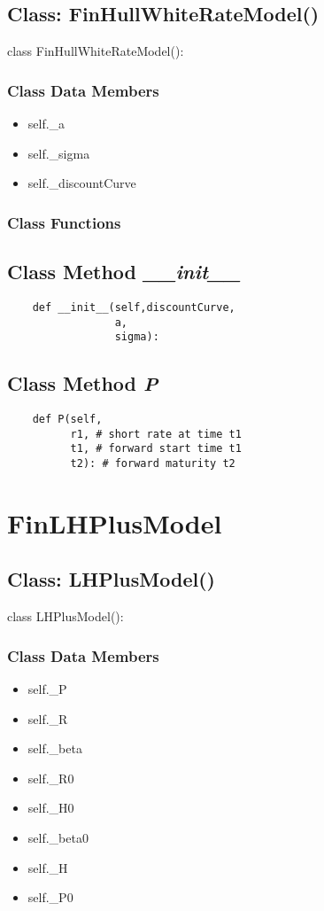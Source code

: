 \documentclass[twoside,11pt]{book}
\begin{document}
\subsection{Class: FinHullWhiteRateModel()}
class FinHullWhiteRateModel():

\subsubsection{Class Data Members}
\begin{itemize}
\item{self.\_a}
\item{self.\_sigma}
\item{self.\_discountCurve}
\end{itemize}

\subsubsection{Class Functions}

\subsection{Class Method {\it \_\_init\_\_}}


\begin{lstlisting}
    def __init__(self,discountCurve,
                 a,
                 sigma):
\end{lstlisting}

\subsection{Class Method {\it P}}


\begin{lstlisting}
    def P(self,
          r1, # short rate at time t1
          t1, # forward start time t1
          t2): # forward maturity t2
\end{lstlisting}

\newpage
\section{FinLHPlusModel}

\subsection{Class: LHPlusModel()}
class LHPlusModel():

\subsubsection{Class Data Members}
\begin{itemize}
\item{self.\_P}
\item{self.\_R}
\item{self.\_beta}
\item{self.\_R0}
\item{self.\_H0}
\item{self.\_beta0}
\item{self.\_H}
\item{self.\_P0}
\end{itemize}
\end{document}
